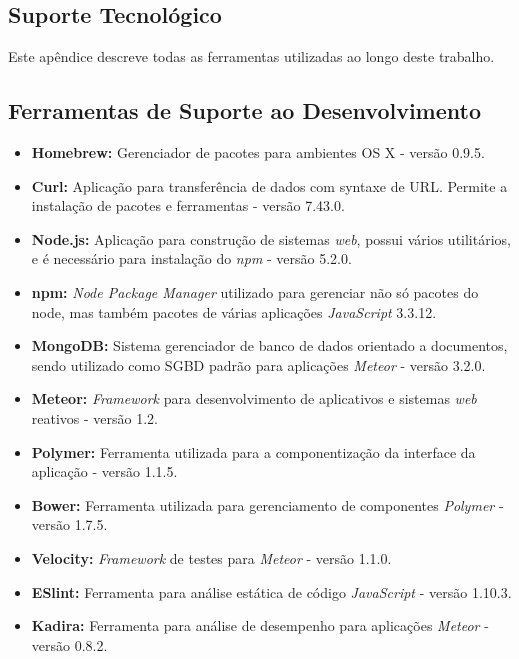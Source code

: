\begin{apendicesenv}

\partapendices

\chapter{Suporte Tecnológico}

Este apêndice descreve todas as ferramentas utilizadas ao longo deste trabalho.

\section{Ferramentas de Suporte ao Desenvolvimento}
\begin{itemize}
	\item \textbf{Homebrew:} Gerenciador de pacotes para ambientes OS X - versão 0.9.5.
	\item \textbf{Curl:} Aplicação para transferência de dados com syntaxe de URL. Permite a instalação de pacotes e ferramentas - versão 7.43.0.
	\item \textbf{Node.js:} Aplicação para construção de sistemas \textit{web}, possui vários utilitários, e é necessário para instalação do \textit{npm} - versão 5.2.0.
	\item \textbf{npm:} \textit{Node Package Manager} utilizado para gerenciar não só pacotes do node, mas também pacotes de várias aplicações \textit{JavaScript} 3.3.12.
	\item \textbf{MongoDB:} Sistema gerenciador de banco de dados orientado a documentos, sendo utilizado como SGBD padrão para aplicações \textit{Meteor} - versão 3.2.0.
	\item \textbf{Meteor:} \textit{Framework} para desenvolvimento de aplicativos e sistemas \textit{web} reativos - versão 1.2. 
	\item \textbf{Polymer:} Ferramenta utilizada para a componentização da interface da aplicação - versão 1.1.5.
	\item \textbf{Bower:}  Ferramenta utilizada para gerenciamento de componentes \textit{Polymer} - versão 1.7.5.
	\item \textbf{Velocity:} \textit{Framework} de testes para \textit{Meteor} - versão 1.1.0.
	\item \textbf{ESlint:} Ferramenta para análise estática de código \textit{JavaScript} - versão 1.10.3.
	\item \textbf{Kadira:} Ferramenta para análise de desempenho para aplicações \textit{Meteor} - versão 0.8.2.

\end{itemize}
\end{apendicesenv}

